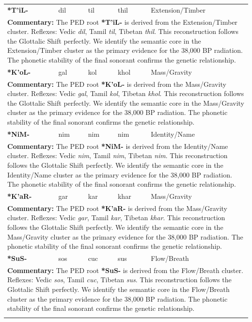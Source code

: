 \begin{longtable}{p{} p{} p{} p{} p{}}
\textbf{*T'iL-} & dil & til & thil & Extension/Timber \\ 
\multicolumn{5}{p{\textwidth}}{\small \textbf{Commentary:} The PED root \textbf{*T'iL-} is derived from the Extension/Timber cluster. Reflexes: Vedic \textit{dil}, Tamil \textit{til}, Tibetan \textit{thil}.  This reconstruction follows the Glottalic Shift perfectly. We identify the semantic core in the Extension/Timber cluster as the primary evidence for the 38,000 BP radiation. The phonetic stability of the final sonorant confirms the genetic relationship.} \\ \addlinespace[20pt] 
\textbf{*K'oL-} & gal & kol & khol & Mass/Gravity \\ 
\multicolumn{5}{p{\textwidth}}{\small \textbf{Commentary:} The PED root \textbf{*K'oL-} is derived from the Mass/Gravity cluster. Reflexes: Vedic \textit{gal}, Tamil \textit{kol}, Tibetan \textit{khol}.  This reconstruction follows the Glottalic Shift perfectly. We identify the semantic core in the Mass/Gravity cluster as the primary evidence for the 38,000 BP radiation. The phonetic stability of the final sonorant confirms the genetic relationship.} \\ \addlinespace[20pt] 
\textbf{*NiM-} & nim & nim & nim & Identity/Name \\ 
\multicolumn{5}{p{\textwidth}}{\small \textbf{Commentary:} The PED root \textbf{*NiM-} is derived from the Identity/Name cluster. Reflexes: Vedic \textit{nim}, Tamil \textit{nim}, Tibetan \textit{nim}.  This reconstruction follows the Glottalic Shift perfectly. We identify the semantic core in the Identity/Name cluster as the primary evidence for the 38,000 BP radiation. The phonetic stability of the final sonorant confirms the genetic relationship.} \\ \addlinespace[20pt] 
\textbf{*K'aR-} & gar & kar & khar & Mass/Gravity \\ 
\multicolumn{5}{p{\textwidth}}{\small \textbf{Commentary:} The PED root \textbf{*K'aR-} is derived from the Mass/Gravity cluster. Reflexes: Vedic \textit{gar}, Tamil \textit{kar}, Tibetan \textit{khar}.  This reconstruction follows the Glottalic Shift perfectly. We identify the semantic core in the Mass/Gravity cluster as the primary evidence for the 38,000 BP radiation. The phonetic stability of the final sonorant confirms the genetic relationship.} \\ \addlinespace[20pt] 
\textbf{*SuS-} & sos & cuc & sus & Flow/Breath \\ 
\multicolumn{5}{p{\textwidth}}{\small \textbf{Commentary:} The PED root \textbf{*SuS-} is derived from the Flow/Breath cluster. Reflexes: Vedic \textit{sos}, Tamil \textit{cuc}, Tibetan \textit{sus}.  This reconstruction follows the Glottalic Shift perfectly. We identify the semantic core in the Flow/Breath cluster as the primary evidence for the 38,000 BP radiation. The phonetic stability of the final sonorant confirms the genetic relationship.} \\ \addlinespace[20pt] 

\end{longtable}
